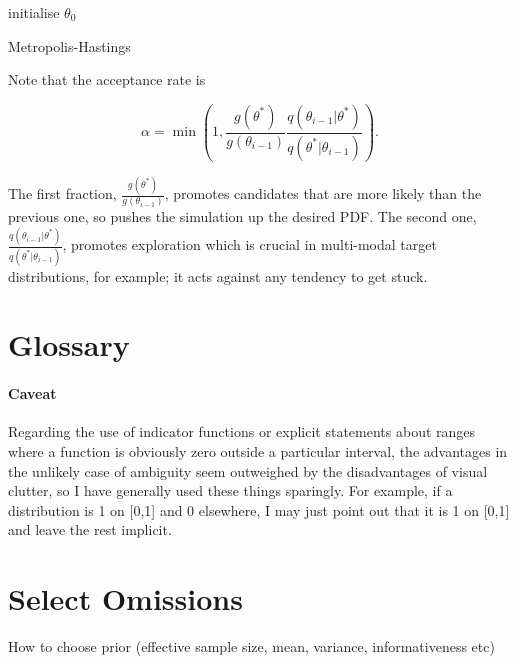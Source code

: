 \documentclass{article}
\begin{document}
\begin{algorithm}[H]
\SetAlgoLined
{}
 initialise $\theta_0$\;
 \caption{Metropolis-Hastings}
 
 Note that the acceptance rate is
 
 \begin{equation}
    \alpha=\min{(1, \frac{g(\theta^{*})}{g(\theta_{i-1})}
    \frac{q(\theta_{i-1}|\theta^{*})}{q(\theta^{*}|\theta_{i-1})})}   .
 \end{equation}
 
\end{algorithm}

The first fraction, $\frac{g(\theta^{*})}{g(\theta_{i-1})}$, promotes candidates that are more likely than the previous one, so pushes the simulation up the desired PDF. The second one, $\frac{q(\theta_{i-1}|\theta^{*})}{q(\theta^{*}|\theta_{i-1})}$, promotes exploration which is crucial in multi-modal target distributions, for example; it acts against any tendency to get stuck.

\section{Glossary}
\paragraph{Caveat}
Regarding the use of indicator functions or explicit statements about ranges where a function is obviously zero outside a particular interval, the advantages in the unlikely case of ambiguity seem outweighed by the disadvantages of visual clutter, so I have generally used these things sparingly. For example, if a distribution is 1 on [0,1] and 0 elsewhere, I may just point out that it is 1 on [0,1] and leave the rest implicit.
\section{Select Omissions}
How to choose prior (effective sample size, mean, variance, informativeness etc)
\end{document}
